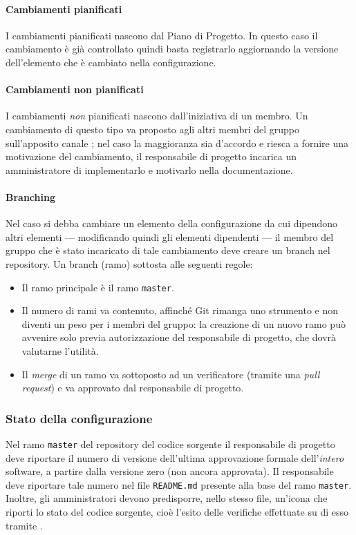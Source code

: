 \paragraph{Cambiamenti pianificati} I cambiamenti pianificati nascono dal Piano di Progetto. In questo caso il cambiamento è già controllato quindi basta registrarlo aggiornando la versione dell'elemento che è cambiato nella configurazione.
\paragraph{Cambiamenti non pianificati} I cambiamenti \emph{non} pianificati nascono dall'iniziativa di un membro. Un cambiamento di questo tipo va proposto agli altri membri del gruppo sull'apposito canale ; nel caso la maggioranza sia d'accordo e riesca a fornire una motivazione del cambiamento, il responsabile di progetto incarica un amministratore di implementarlo e motivarlo nella documentazione.
\paragraph{Branching} Nel caso si debba cambiare un elemento della configurazione da cui dipendono altri elementi --- modificando quindi gli elementi dipendenti --- il membro del gruppo che è stato incaricato di tale cambiamento deve creare un branch nel repository. Un branch (ramo) sottosta alle seguenti regole:
\begin{itemize}
	\item Il ramo principale è il ramo \texttt{master}.
	\item Il numero di rami va contenuto, affinché Git rimanga uno strumento e non diventi un peso per i membri del gruppo: la creazione di un nuovo ramo può avvenire solo previa autorizzazione del responsabile di progetto, che dovrà valutarne l'utilità.
	\item Il \emph{merge} di un ramo va sottoposto ad un verificatore (tramite una \emph{pull request}) e va approvato dal responsabile di progetto.
\end{itemize}

\subsubsection{Stato della configurazione}
Nel ramo \texttt{master} del repository del codice sorgente il responsabile di progetto deve riportare il numero di versione dell'ultima approvazione formale dell'\emph{intero} software, a partire dalla versione zero (non ancora approvata). Il responsabile deve riportare tale numero nel file \texttt{README.md} presente alla base del ramo \texttt{master}. Inoltre, gli amministratori devono predisporre, nello stesso file, un'icona che riporti lo stato del codice sorgente, cioè l'esito delle verifiche effettuate su di esso tramite .



